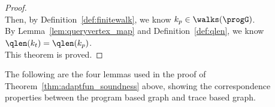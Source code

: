 \begin{proof}
\\
Then, by Definition~\ref{def:finitewalk}, we know $k_p \in \walks(\progG)$.
\\
By Lemma~\ref{lem:queryvertex_map} and Definition~\ref{def:qlen}, we know $\qlen(k_t) = \qlen(k_p)$.
%
%
%
%
\\
This theorem is proved.
\end{proof}
The following are the four lemmas used in the proof of Theorem~\ref{thm:adaptfun_soundness} above,
showing the correspondence properties between the program based graph and trace based graph.
